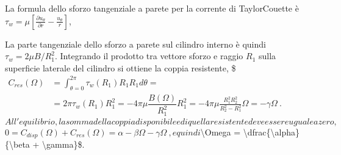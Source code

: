 \documentclass[letterpaper,10pt,italian]{jupyterBook}
\begin{document}
\begin{itemize}
\sphinxAtStartPar
La formula dello sforzo tangenziale a parete per la corrente di
Taylor\sphinxhyphen{}Couette è
\(\tau_w = \mu \left[ \frac{\partial u_\theta}{\partial r} - \frac{u_\theta}{r} \right]\),

\sphinxAtStartPar
La parte tangenziale dello sforzo a parete sul cilindro interno è
quindi \(\tau_w = 
2 \mu {B}/{R_1^2}\). Integrando il prodotto tra vettore sforzo e
raggio \(R_1\) sulla superficie laterale del cilindro si ottiene la
coppia resistente, \$\(\begin{aligned}
 C_{res}(\Omega) & = \int_{\theta=0}^{2\pi} \tau_w(R_1) R_1 R_1 d\theta  = \\ & = 2\pi \tau_w(R_1) R_1^2 = -4\pi \mu \dfrac{B(\Omega)}{R_1^2}R_1^2 =  -4\pi \mu  \frac{R_1^2 R_2^2}{R_2^2-R_1^2} \Omega  = - \gamma \Omega \ .
\end{aligned}\)\( All'equilibrio, la somma della coppia disponibile e
di quella resistente deve essere uguale a zero,
\)\(0 = C_{disp}(\Omega) + C_{res}(\Omega) = \alpha - \beta \Omega -  \gamma \Omega \ ,\)\(
e quindi \)\textbackslash{}Omega = \textbackslash{}dfrac\{\textbackslash{}alpha\}\{\textbackslash{}beta + \textbackslash{}gamma\}\$.

\end{itemize}

\sphinxstepscope
\end{document}
